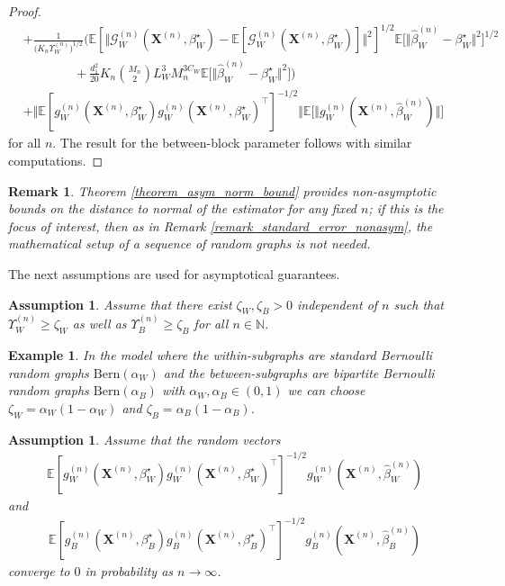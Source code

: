\documentclass{article}
\newtheorem{Remark}[Theorem]{Remark}
\newtheorem{Assumption}[Theorem]{Assumption}
\newtheorem{Example}[Theorem]{Example}
\begin{document}
\begin{proof}
\begin{align*}
    & +\frac{1}{\big(K_n\Upsilon_W^{(n)}\big)^{1/2}} \bigg( \mathbb{E}[ \Vert \mathcal{G}_W^{(n)}(\mathbf{X}^{(n)},\beta_W^{\star}) -  \mathbb{E}[\mathcal{G}_W^{(n)}(\mathbf{X}^{(n)},\beta_W^{\star})]\Vert^2 ]^{1/2} \mathbb{E}\big[ \Vert \hat{\beta}_W^{(n)} - \beta_W^{\star} \Vert^2 ]^{1/2} \\
    & \qquad \qquad+ \frac{d_1^2}{20} K_n \binom{M_n}{2}  L_W^3 M_n^{3C_W} \mathbb{E}\big[ \Vert \hat{\beta}_W^{(n)}-\beta_W^{\star}\Vert^2 \big] \bigg) \\
    &  +\Vert \mathbb{E}[g_W^{(n)}(\mathbf{X}^{(n)},\beta_W^{\star})g_W^{(n)}(\mathbf{X}^{(n)},\beta_W^{\star})^{\top}]^{-1/2} \Vert \mathbb{E}\big[\Vert g_W^{(n)}(\mathbf{X}^{(n)},\hat{\beta}_W^{(n)}) \Vert \big]
\end{align*}
for all $n$. The result for the between-block parameter 
follows with similar computations.
\end{proof}


\begin{Remark}
    Theorem \ref{theorem_asym_norm_bound} provides non-asymptotic bounds on the distance to normal of the estimator for any fixed $n$; if this is the focus of interest, then as in Remark \ref{remark_standard_error_nonasym},   the mathematical setup of a sequence of random graphs is not needed.
\end{Remark}
The next  assumptions  are used for asymptotical guarantees.

\begin{Assumption}  \label{ass_min_eig_sum}
Assume that there exist $\zeta_W,\zeta_B>0$ independent of $n$ such that $\Upsilon_W^{(n)} \geq \zeta_W$ as well as $\Upsilon_B^{(n)} \geq \zeta_B$
for all $n \in \mathbb{N}$.
\end{Assumption}

\begin{Example}
    In the model where the within-subgraphs are standard Bernoulli random graphs $\mathrm{Bern}(\alpha_W)$ and the between-subgraphs are bipartite Bernoulli random graphs $\mathrm{Bern}(\alpha_B)$ with $\alpha_W, \alpha_B \in (0,1)$ we can choose $\zeta_W = \alpha_W(1-\alpha_W)$ and $\zeta_B=\alpha_B(1-\alpha_B)$.
\end{Example}

\begin{Assumption} \label{ass_conv_prob_remainder}
    Assume that the random vectors 
    \begin{align*}
         \mathbb{E}[g_W^{(n)}(\mathbf{X}^{(n)},\beta_W^{\star})g_W^{(n)}(\mathbf{X}^{(n)},\beta_W^{\star})^{\top}]^{-1/2} g_W^{(n)}(\mathbf{X}^{(n)},\hat{\beta}_W^{(n)})
    \end{align*}
    and 
    \begin{align*}
        \mathbb{E}[g_B^{(n)}(\mathbf{X}^{(n)},\beta_B^{\star})g_B^{(n)}(\mathbf{X}^{(n)},\beta_B^{\star})^{\top}]^{-1/2} g_B^{(n)}(\mathbf{X}^{(n)},\hat{\beta}_B^{(n)})
    \end{align*}
    converge to $0$ in probability as $n \rightarrow \infty$.
\end{Assumption}
\end{document}
